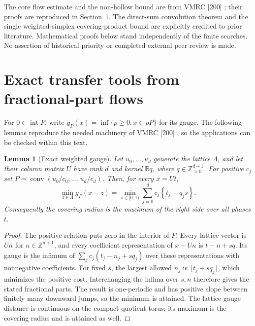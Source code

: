\documentclass[11pt,a4paper]{article}
\newtheorem{lemma}[theorem]{Lemma}
\theoremstyle{remark}\newtheorem{remark}[theorem]{Remark}
\DeclareMathOperator{\conv}{conv}
\DeclareMathOperator{\inter}{int}
\newcommand{\R}{\mathbb R}\newcommand{\Z}{\mathbb Z}\newcommand{\Q}{\mathbb Q}
\newcommand{\fr}[1]{\left\{#1\right\}}\newcommand{\one}{\mathbf1}
\begin{document}
The core flow estimate and the non-hollow bound are from VMRC [200]
\cite{VMRC200}; their proofs are reproduced in Section~\ref{sec:tools}.
The direct-sum convolution theorem and the single weighted-simplex
covering-product bound are explicitly credited to prior literature.
Mathematical proofs below stand independently of the finite searches.
No assertion of historical priority or completed external peer review
is made.


\section{Exact transfer tools from fractional-part flows}
\label{sec:tools}
For $0\in\inter P$, write
$g_P(x)=\inf\{\rho\ge0:x\in\rho P\}$ for its gauge.
The following lemmas reproduce the needed machinery of VMRC [200]
\cite{VMRC200}, so the applications can be checked within this text.

\begin{lemma}[Exact weighted gauge]\label{tool:gauge}
Let $u_0,\ldots,u_d$ generate the lattice $\Lambda$, and let their
column matrix $U$ have rank $d$ and kernel $\R q$, where
$q\in\Z_{>0}^{d+1}$. For positive $c_j$ set
$P=\conv(u_0/c_0,\ldots,u_d/c_d)$. Then, for every $x=Ut$,
\begin{equation}\label{tool:gaugeeq}
 \min_{z\in\Lambda}g_P(x-z)
 =\min_{s\in[0,1)}\sum_{j=0}^dc_j\fr{t_j+q_js}.
\end{equation}
Consequently the covering radius is the maximum of the right side
over all phases $t$.
\end{lemma}
\begin{proof}
The positive relation puts zero in the interior of $P$.
Every lattice vector is $Un$ for $n\in\Z^{d+1}$, and every
coefficient representation of $x-Un$ is $t-n+sq$.
Its gauge is the infimum of $\sum_jc_j(t_j-n_j+sq_j)$ over these
representations with nonnegative coefficients. For fixed $s$,
the largest allowed $n_j$ is $\lfloor t_j+sq_j\rfloor$, which
minimizes the positive cost. Interchanging the infima over $s,n$
therefore gives the stated fractional parts. The result is
one-periodic and has positive slope between finitely many downward
jumps, so the minimum is attained. The lattice gauge distance is
continuous on the compact quotient torus; its maximum is the
covering radius and is attained as well.
\end{proof}
\end{document}

